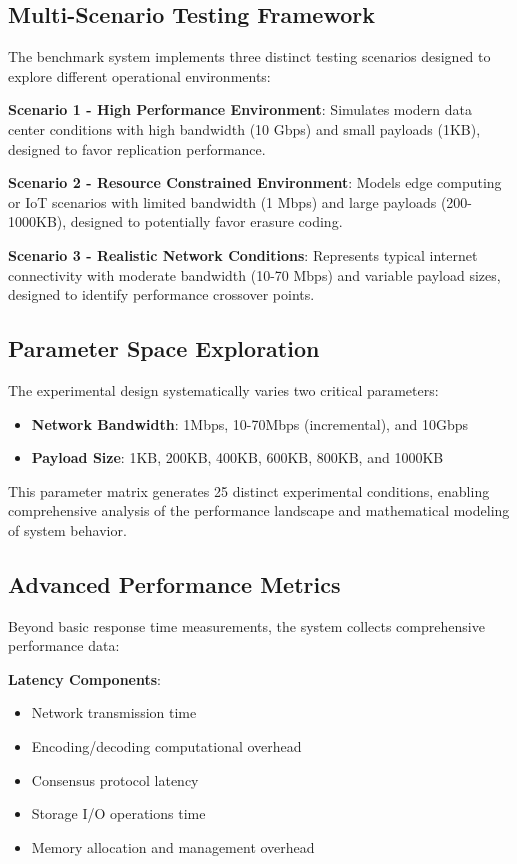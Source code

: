 \subsection{Multi-Scenario Testing Framework}

The benchmark system implements three distinct testing scenarios designed to explore different operational environments:

\textbf{Scenario 1 - High Performance Environment}: Simulates modern data center conditions with high bandwidth (10 Gbps) and small payloads (1KB), designed to favor replication performance.

\textbf{Scenario 2 - Resource Constrained Environment}: Models edge computing or IoT scenarios with limited bandwidth (1 Mbps) and large payloads (200-1000KB), designed to potentially favor erasure coding.

\textbf{Scenario 3 - Realistic Network Conditions}: Represents typical internet connectivity with moderate bandwidth (10-70 Mbps) and variable payload sizes, designed to identify performance crossover points.

\subsection{Parameter Space Exploration}

The experimental design systematically varies two critical parameters:
\begin{itemize}
\item \textbf{Network Bandwidth}: 1Mbps, 10-70Mbps (incremental), and 10Gbps
\item \textbf{Payload Size}: 1KB, 200KB, 400KB, 600KB, 800KB, and 1000KB
\end{itemize}

This parameter matrix generates 25 distinct experimental conditions, enabling comprehensive analysis of the performance landscape and mathematical modeling of system behavior.

\subsection{Advanced Performance Metrics}

Beyond basic response time measurements, the system collects comprehensive performance data:

\textbf{Latency Components}:
\begin{itemize}
\item Network transmission time
\item Encoding/decoding computational overhead
\item Consensus protocol latency
\item Storage I/O operations time
\item Memory allocation and management overhead
\end{itemize}

